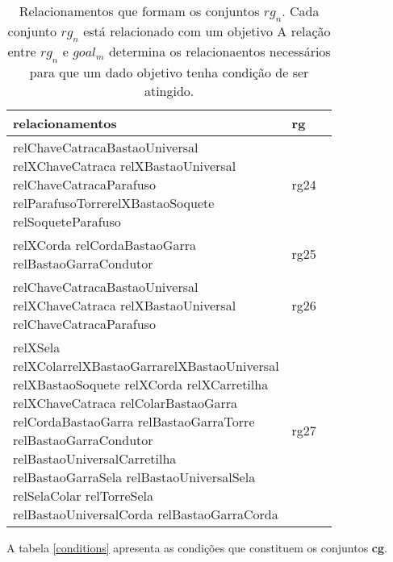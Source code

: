 \begin{table}[H]
\centering
{}
\begin{tabular}{|p{0.8\linewidth}|l|}
\hline
\textbf{relacionamentos}                                                                                                                                                                                                                                                                                                                  & \textbf{rg} \\ \hline
relChaveCatracaBastaoUniversal relXChaveCatraca relXBastaoUniversal relChaveCatracaParafuso relParafusoTorrerelXBastaoSoquete relSoqueteParafuso                                                                                                                                                                                           & rg24        \\ \hline
relXCorda relCordaBastaoGarra relBastaoGarraCondutor                                                                                                                                                                                                                                                                                      & rg25        \\ \hline
relChaveCatracaBastaoUniversal relXChaveCatraca relXBastaoUniversal relChaveCatracaParafuso                                                                                                                                                                                                                                               & rg26        \\ \hline
relXSela relXColarrelXBastaoGarrarelXBastaoUniversal relXBastaoSoquete relXCorda relXCarretilha relXChaveCatraca relColarBastaoGarra relCordaBastaoGarra relBastaoGarraTorre relBastaoGarraCondutor relBastaoUniversalCarretilha relBastaoGarraSela relBastaoUniversalSela relSelaColar relTorreSela relBastaoUniversalCorda relBastaoGarraCorda & rg27  \\ \hline
\end{tabular}
\caption{Relacionamentos que formam os conjuntos $rg_n$. Cada conjunto $rg_n$ está relacionado com um objetivo A relação entre $rg_n$ e $goal_m$ determina os relacionaentos necessários para que um dado objetivo tenha condição de ser atingido.}
\label{relationsgroup2}
\end{table}




A tabela \ref{conditions} apresenta as condições que constituem os conjuntos \textbf{cg}.

